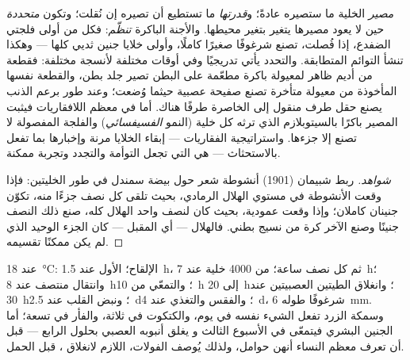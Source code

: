 \begin{proposition}\label{prop:b2:vertebrate-development:commitment}
\emph{مصير} الخلية ما ستصيره عادةً؛ و\emph{قدرتها}
ما تستطيع أن تصيره إن نُقلت؛ وتكون
\emph{متحددة} حين لا يعود مصيرها يتغير بتغير
محيطها. والأجنة الباكرة \emph{تنظّم}: فكل من أولى فلجتي
الضفدع، إذا فُصلت، تصنع شرغوفًا صغيرًا كاملًا، وأولى
خلايا جنين ثديي  كلها --- وهكذا تنشأ
التوائم المتطابقة. والتحدد يأتي تدريجيًا وفي
أوقات مختلفة لأنسجة مختلفة: فقطعة من أديم ظاهر لمعيولة
باكرة مطعّمة على البطن تصير جلد بطن، والقطعة نفسها
المأخوذة من معيولة متأخرة تصنع صفيحة عصبية حيثما وُضعت؛
وعند طور برعم الذنب يصنع حقل طرف منقول إلى الخاصرة
طرفًا هناك. أما في معظم اللافقاريات فيثبت المصير باكرًا
بالسيتوبلازم الذي ترثه كل خلية (النمو \emph{الفسيفسائي})
والفلجة المفصولة لا تصنع إلا جزءها. واستراتيجية الفقاريات
--- إبقاء الخلايا مرنة وإخبارها بما تفعل بالاستحثاث ---
هي التي تجعل التوأمة والتجدد وتجربة 
ممكنة.
\end{proposition}
\begin{proof}[شواهد]
ربط شبيمان (1901) أنشوطة شعر حول بيضة سمندل في طور
الخليتين: فإذا وقعت الأنشوطة في مستوي الهلال الرمادي، بحيث
تلقى كل نصف جزءًا منه، تكوّن جنينان كاملان؛ وإذا
وقعت عمودية، بحيث كان لنصف واحد الهلال كله، صنع ذلك
النصف جنينًا وصنع الآخر كرة من نسيج بطني. فالهلال
--- أي  المقبل --- كان الجزء الوحيد الذي لم يكن
ممكنًا تقسيمه.
\end{proof}

\begin{example}\label{ex:b2:vertebrate-development:timetable}
عند \qty{18}{\celsius}: الإلقاح؛  الأول عند \qty{1.5}{h}،
ثم كل نصف ساعة؛  من \num{4000} خلية عند \qty{7}{h}؛
وانتقال منتصف  عند \qty{8}{h}؛ والتمعّي من \qty{10}{h} إلى
\qty{20}{h}؛ وانغلاق الطيتين العصبيتين عند \qty{30}{h}؛ ونبض القلب عند
\qty{2.5}{d}؛ والفقس والتغذي عند \qty{4}{d}، شرغوفًا طوله
\qty{6}{mm}. وسمكة الزرد تفعل الشيء نفسه في يوم، والكتكوت في ثلاثة،
والفأر في تسعة؛ أما الجنين البشري فيتمعّى في الأسبوع الثالث و
يغلق أنبوبه العصبي بحلول الرابع --- قبل أن تعرف معظم النساء أنهن
حوامل، ولذلك يُوصف الفولات، اللازم لانغلاق ،
قبل الحمل.
\end{example}

